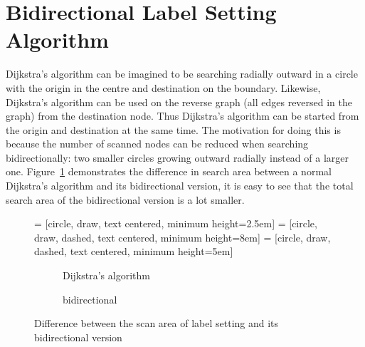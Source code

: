 \section{Bidirectional Label Setting Algorithm} \label{section:bidirectional}
Dijkstra's algorithm can be imagined to be searching radially outward in a circle with the origin in the centre and destination on the boundary.
Likewise, Dijkstra's algorithm can be used on the reverse graph (all edges reversed in the graph) from the destination node.
Thus Dijkstra's algorithm can be started from the origin and destination at the same time.
The motivation for doing this is because the number of scanned nodes can be reduced when searching bidirectionally:
two smaller circles growing outward radially instead of a larger one.
Figure~\ref{fig:bidirect} demonstrates the difference in search area between a normal Dijkstra's algorithm and its bidirectional version,
it is easy to see that the total search area of the bidirectional version is a lot smaller.

\begin{figure}[H]
     = [circle, draw, text centered, minimum height=2.5em]
     = [circle, draw, dashed, text centered, minimum height=8em]
     = [circle, draw, dashed, text centered, minimum height=5em]
    \centering
    \begin{subfigure}[t]{.4\textwidth}
        \centering
        \caption{Dijkstra's algorithm}
    \end{subfigure}
    \begin{subfigure}[t]{.4\textwidth}
        \centering
        \caption{bidirectional}
    \end{subfigure}
    \caption{Difference between the scan area of label setting and its bidirectional version}
    \label{fig:bidirect}
\end{figure}

